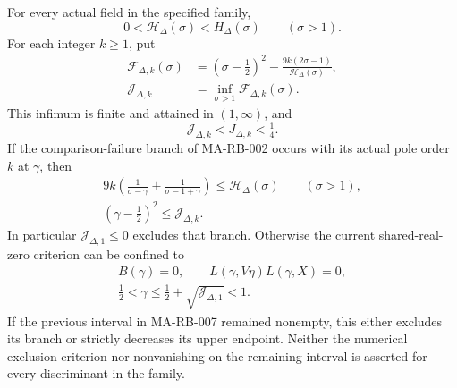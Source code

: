 For every actual field in the specified family,
\[
             0<\mathcal H_\Delta(\sigma)<H_\Delta(\sigma)
                                  \qquad(\sigma>1).
 \tag{MA-RB.86}
\]
For each integer \(k\ge1\), put
\[
 \begin{aligned}
 \mathcal F_{\Delta,k}(\sigma)
   &=(\sigma-\tfrac12)^2
           -\frac{9k(2\sigma-1)}{\mathcal H_\Delta(\sigma)},\\
 \mathcal J_{\Delta,k}
   &=\inf_{\sigma>1}\mathcal F_{\Delta,k}(\sigma).
 \end{aligned}
 \tag{MA-RB.87}
\]
This infimum is finite and attained in \((1,\infty)\), and
\[
                  \mathcal J_{\Delta,k}<J_{\Delta,k}<\tfrac14.
 \tag{MA-RB.88}
\]
If the comparison-failure branch of MA-RB-002 occurs
with its actual pole order \(k\) at \(\gamma\), then
\[
 \begin{gathered}
 9k\left(\frac1{\sigma-\gamma}
             +\frac1{\sigma-1+\gamma}\right)
                 \le\mathcal H_\Delta(\sigma)
                                  \qquad(\sigma>1),\\
                  (\gamma-\tfrac12)^2
                            \le\mathcal J_{\Delta,k}.
 \end{gathered}
 \tag{MA-RB.89}
\]
In particular \(\mathcal J_{\Delta,1}\le0\) excludes
that branch. Otherwise the current shared-real-zero
criterion can be confined to
\[
 \begin{gathered}
 B(\gamma)=0,\qquad
       L(\gamma,V\eta)L(\gamma,X)=0,\\
 \tfrac12<\gamma
       \le\tfrac12+\sqrt{\mathcal J_{\Delta,1}}<1 .
 \end{gathered}
 \tag{MA-RB.90}
\]
If the previous interval in MA-RB-007 remained nonempty,
this either excludes its branch or strictly decreases
its upper endpoint. Neither the numerical exclusion
criterion nor nonvanishing on the remaining interval
is asserted for every discriminant in the family.

